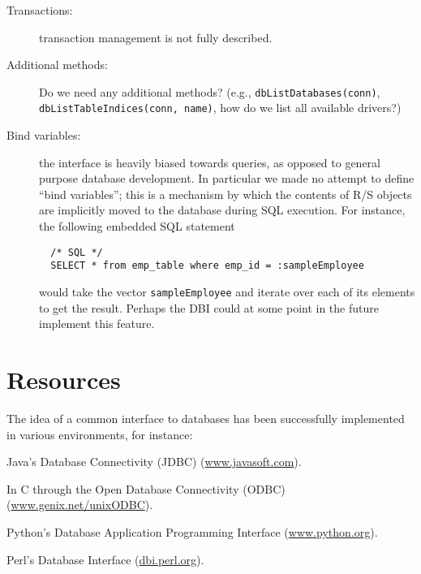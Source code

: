 \documentclass[graphics,times,psfig,dvips,hyper]{article}
\newcommand{\sobj}[1]{\mbox{\tt #1}}    %
\newcommand{\sexp}[1]{\mbox{\tt #1}}    %
\begin{document}
\begin{description}
\item[Transactions:]
  transaction management is not fully described.

\item[Additional methods:]
  Do we need any additional methods? (e.g., \sexp{dbListDatabases(conn)},
  \sexp{dbListTableIndices(conn, name)}, 
  how do we list all available drivers?)

\item[Bind variables:]
  the interface is heavily biased towards queries, as opposed to
  general purpose database development.  In particular we made
  no attempt to define ``bind variables''; this is a mechanism
  by which the contents of R/S objects are implicitly moved to
  the database during SQL execution.  For instance, the following
  embedded SQL statement

\begin{verbatim}
  /* SQL */
  SELECT * from emp_table where emp_id = :sampleEmployee
\end{verbatim}
  would take the vector \sobj{sampleEmployee} and iterate over each
  of its elements to get the result.  Perhaps the DBI could at some
  point in the future implement this feature.

\end{description}

\section{Resources}\label{sec:resources}
The idea of a common interface to databases has been successfully
implemented in various environments, for instance:

Java's Database Connectivity (JDBC)
(\href{http://www.javasoft.com/products/jdbc/index.html}{www.javasoft.com}).

In C through the Open Database Connectivity (ODBC)
(\href{http://www.genix.net/unixODBC}{www.genix.net/unixODBC}).

Python's Database Application Programming Interface
(\href{http://www.python.org/topics/database}{www.python.org}).

Perl's Database Interface
(\href{http://dbi.perl.org}{dbi.perl.org}).

\nocite{*}


\end{document}
